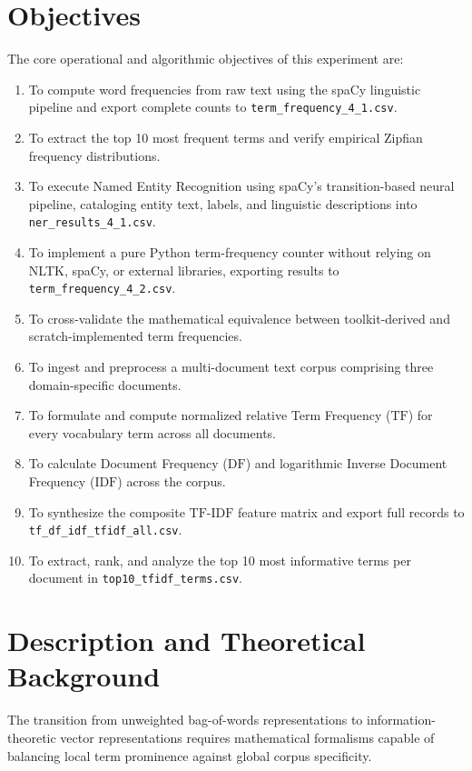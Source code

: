 \documentclass[12pt,a4paper]{report}
\begin{document}
\section{Objectives}
The core operational and algorithmic objectives of this experiment are:
\begin{enumerate}[label=\textbf{\arabic*.}]
    \item To compute word frequencies from raw text using the spaCy linguistic pipeline and export complete counts to \texttt{term\_frequency\_4\_1.csv}.
    \item To extract the top 10 most frequent terms and verify empirical Zipfian frequency distributions.
    \item To execute Named Entity Recognition using spaCy's transition-based neural pipeline, cataloging entity text, labels, and linguistic descriptions into \texttt{ner\_results\_4\_1.csv}.
    \item To implement a pure Python term-frequency counter without relying on NLTK, spaCy, or external libraries, exporting results to \texttt{term\_frequency\_4\_2.csv}.
    \item To cross-validate the mathematical equivalence between toolkit-derived and scratch-implemented term frequencies.
    \item To ingest and preprocess a multi-document text corpus comprising three domain-specific documents.
    \item To formulate and compute normalized relative Term Frequency ($\text{TF}$) for every vocabulary term across all documents.
    \item To calculate Document Frequency ($\text{DF}$) and logarithmic Inverse Document Frequency ($\text{IDF}$) across the corpus.
    \item To synthesize the composite $\text{TF-IDF}$ feature matrix and export full records to \texttt{tf\_df\_idf\_tfidf\_all.csv}.
    \item To extract, rank, and analyze the top 10 most informative terms per document in \texttt{top10\_tfidf\_terms.csv}.
\end{enumerate}

\section{Description and Theoretical Background}
The transition from unweighted bag-of-words representations to information-theoretic vector representations requires mathematical formalisms capable of balancing local term prominence against global corpus specificity.
\end{document}
